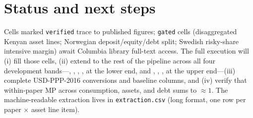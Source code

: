 \documentclass[11pt,a4paper]{article}
\newcommand{\mpx}{\mathrm{MP}}
\begin{document}
\section{Status and next steps}
Cells marked \texttt{verified} trace to published figures; \texttt{gated} cells
(disaggregated Kenyan asset lines; Norwegian deposit/equity/debt split; Swedish
risky-share intensive margin) await Columbia library full-text access. The full
execution will (i) fill those cells, (ii) extend to the rest of the pipeline
across all four development bands---\citet{egger2022general},
\citet{blattman2014generating, blattman2020long}, \citet{banerjee2015multifaceted},
\citet{demel2008returns}, \citet{gertler2012investing} at the lower end, and
\citet{fagereng2019saving}, \citet{cesarini2017effect}, \citet{imbens2001estimating},
\citet{golosov2024lottery} at the upper end---(iii) complete USD-PPP-2016
conversions and baseline columns, and (iv) verify that within-paper $\mpx$ across
consumption, assets, and debt sums to $\approx 1$. The machine-readable extraction
lives in \texttt{extraction.csv} (long format, one row per paper $\times$ asset
line item).



\end{document}
